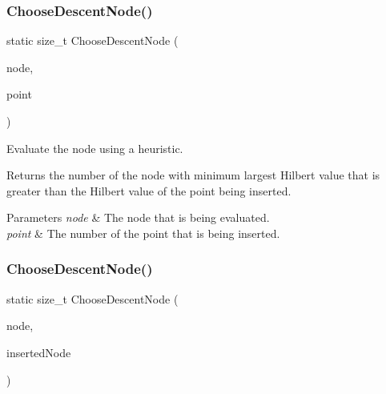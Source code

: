 \subsubsection{Choose\+Descent\+Node()\hspace{0.1cm}{\footnotesize\ttfamily [1/2]}}
{\footnotesize\ttfamily static size\+\_\+t Choose\+Descent\+Node (\begin{DoxyParamCaption}\item[{const Tree\+Type $\ast$}]{node,  }\item[{const size\+\_\+t}]{point }\end{DoxyParamCaption})\hspace{0.3cm}{\ttfamily [static]}}



Evaluate the node using a heuristic. 

Returns the number of the node with minimum largest Hilbert value that is greater than the Hilbert value of the point being inserted.


\begin{DoxyParams}{Parameters}
{\em node} & The node that is being evaluated. \\
\hline
{\em point} & The number of the point that is being inserted. \\
\hline
\end{DoxyParams}
\mbox{\label{classmlpack_1_1tree_1_1HilbertRTreeDescentHeuristic_aa91503da5ab453e1a2e13cde6deded48}} 
\subsubsection{Choose\+Descent\+Node()\hspace{0.1cm}{\footnotesize\ttfamily [2/2]}}
{\footnotesize\ttfamily static size\+\_\+t Choose\+Descent\+Node (\begin{DoxyParamCaption}\item[{const Tree\+Type $\ast$}]{node,  }\item[{const Tree\+Type $\ast$}]{inserted\+Node }\end{DoxyParamCaption})\hspace{0.3cm}{\ttfamily [static]}}



